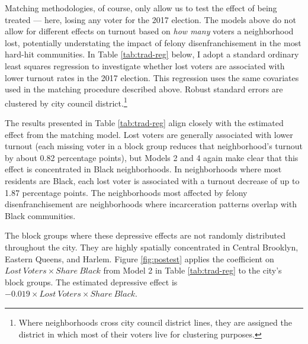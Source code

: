 \documentclass[12pt,]{article}
\let\rmarkdownfootnote\footnote%
\def\footnote{\protect\rmarkdownfootnote}
\begin{document}
Matching methodologies, of course, only allow us to test the effect of being treated --- here, losing any voter for the 2017 election. The models above do not allow for different effects on turnout based on \emph{how many} voters a neighborhood lost, potentially understating the impact of felony disenfranchisement in the most hard-hit communities. In Table \ref{tab:trad-reg} below, I adopt a standard ordinary least squares regression to investigate whether lost voters are associated with lower turnout rates in the 2017 election. This regression uses the same covariates used in the matching procedure described above. Robust standard errors are clustered by city council district.\footnote{Where neighborhoods cross city council district lines, they are assigned the district in which most of their voters live for clustering purposes.}



The results presented in Table \ref{tab:trad-reg} align closely with the estimated effect from the matching model. Lost voters are generally associated with lower turnout (each missing voter in a block group reduces that neighborhood's turnout by about 0.82 percentage points), but Models 2 and 4 again make clear that this effect is concentrated in Black neighborhoods. In neighborhoods where most residents are Black, each lost voter is associated with a turnout decrease of up to 1.87 percentage points. The neighborhoods most affected by felony disenfranchisement are neighborhoods where incarceration patterns overlap with Black communities.

The block groups where these depressive effects are not randomly distributed throughout the city. They are highly spatially concentrated in Central Brooklyn, Eastern Queens, and Harlem. Figure \ref{fig:postest} applies the coefficient on \(Lost\ Voters \times Share\ Black\) from Model 2 in Table \ref{tab:trad-reg} to the city's block groups. The estimated depressive effect is \(-0.019\times Lost\ Voters \times Share\ Black\).
\end{document}
